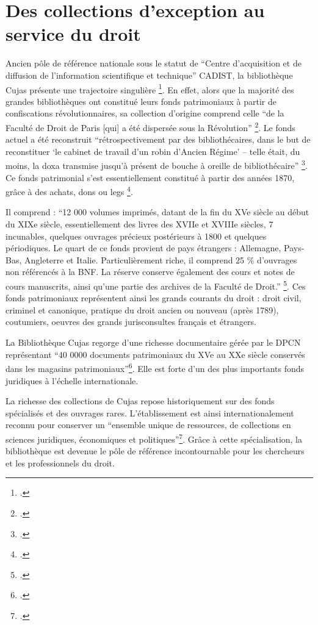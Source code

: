 \section{Des collections d'exception au service du droit}
Ancien pôle de référence nationale sous le statut de \enquote{Centre d'acquisition et de diffusion de l'information scientifique et technique} \ac{CADIST}, la bibliothèque Cujas présente une trajectoire singulière \footcite{lobetCujasTraditionModernite2002}. En effet, alors que la majorité des grandes bibliothèques ont constitué leurs fonds patrimoniaux à partir de confiscations révolutionnaires, sa collection d'origine comprend celle \enquote{de la Faculté de Droit de Paris [qui] a été dispersée sous la Révolution} \footcite{balley2ReveillerFonds2012a}. Le fonds actuel a été reconstruit \enquote{rétrospectivement par des bibliothécaires, dans le but de reconstituer \enquote{le cabinet de travail d'un robin d'Ancien Régime} -- telle était, du moins, la doxa transmise jusqu'à présent de bouche à oreille de bibliothécaire} \footcite{balley2ReveillerFonds2012a}. Ce fonds patrimonial s'est essentiellement constitué à partir des années 1870, grâce à des achats, dons ou legs \footcite{balley2ReveillerFonds2012a}. 

Il comprend : \enquote{12 000 volumes imprimés, datant de la fin du XVe siècle au début du XIXe siècle, essentiellement des livres des XVIIe et XVIIIe siècles, 7 incunables, quelques ouvrages précieux postérieurs à 1800 et quelques périodiques. Le quart de ce fonds provient de pays étrangers : Allemagne, Pays-Bas, Angleterre et Italie. Particulièrement riche, il comprend 25 \% d'ouvrages non référencés à la \ac{BNF}. La réserve conserve également des cours et notes de cours manuscrits, ainsi qu'une partie des archives de la Faculté de Droit.} \footcite{balley2ReveillerFonds2012a}. Ces fonds patrimoniaux représentent ainsi les grands courants du droit : droit civil, criminel et canonique, pratique du droit ancien ou nouveau (après 1789), coutumiers, oeuvres des grands jurisconsultes français et étrangers.

La Bibliothèque Cujas regorge d'une richesse documentaire gérée par le \ac{DPCN} représentant \enquote{40 0000 documents patrimoniaux du XVe au XXe siècle conservés dans les magasins patrimoniaux}\footcite{BibliothequeInteruniversitaireCujas}. Elle est forte d'un des plus importants fonds juridiques à l'échelle internationale.

La richesse des collections de Cujas repose historiquement sur des fonds spécialisés et des ouvrages rares. L'établissement est ainsi internationalement reconnu pour conserver un \enquote{ensemble unique de ressources, de collections en sciences juridiques, économiques et politiques}\footcite{BibliothequeInteruniversitaireCujas}. Grâce à cette spécialisation, la bibliothèque est devenue le pôle de référence incontournable pour les chercheurs et les professionnels du droit.

